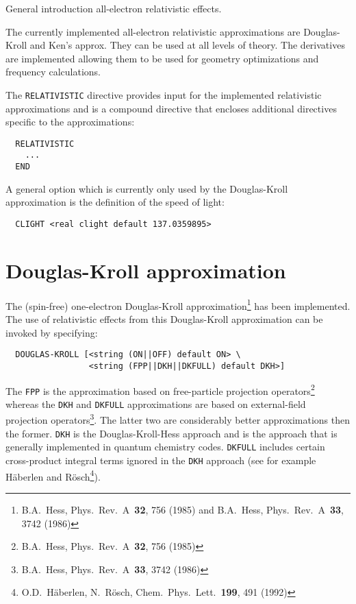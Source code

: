 \label{sec:rel}

General introduction all-electron relativistic effects.

The currently implemented all-electron relativistic approximations are Douglas-Kroll and Ken's approx. They can be used at all levels of theory. The derivatives are implemented allowing them to be used for geometry optimizations and frequency calculations.

The \verb+RELATIVISTIC+ directive provides input for the implemented relativistic 
approximations and is a compound directive that encloses additional directives 
specific to the approximations:

\begin{verbatim}
  RELATIVISTIC
    ...
  END
\end{verbatim}

A general option which is currently only used by the Douglas-Kroll 
approximation is the definition of the speed of light:

\begin{verbatim}
  CLIGHT <real clight default 137.0359895>
\end{verbatim}

\section{Douglas-Kroll approximation}
\label{sec:douglas-kroll}

The (spin-free) one-electron Douglas-Kroll approximation\footnote{B.A.~Hess, 
Phys.~Rev.~A~{\bf 32}, 756 (1985) and B.A.~Hess, Phys.~Rev.~A~{\bf 33}, 3742 
(1986)} has been implemented. The use of relativistic effects from this 
Douglas-Kroll approximation can be invoked by 
specifying:

\begin{verbatim}
  DOUGLAS-KROLL [<string (ON||OFF) default ON> \
                 <string (FPP||DKH||DKFULL) default DKH>]

\end{verbatim}

The \verb+FPP+ is the approximation based on free-particle projection 
operators\footnote{B.A.~Hess, Phys.~Rev.~A~{\bf 32}, 756 (1985)} whereas the 
\verb+DKH+ and \verb+DKFULL+ approximations are based on external-field 
projection operators\footnote{B.A.~Hess, Phys.~Rev.~A~{\bf 33}, 3742 (1986)}.
The latter two are considerably better approximations then the former. \verb+DKH+ 
is the Douglas-Kroll-Hess approach and is the approach that is generally 
implemented in quantum chemistry codes. \verb+DKFULL+ includes certain 
cross-product integral terms ignored in the \verb+DKH+ approach (see for example 
H\"{a}berlen and R\"{o}sch\footnote{O.D.~H\"{a}berlen, N.~R\"{o}sch, 
Chem.~Phys.~Lett.~{\bf 199}, 491 (1992)}).

